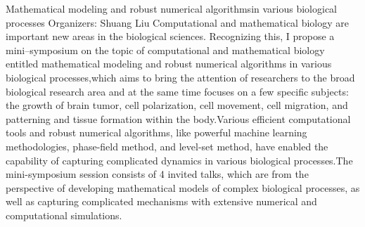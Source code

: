 \label{mini31}

\miniabs
{Mathematical modeling and robust numerical algorithmsin various biological processes}
{Organizers: Shuang Liu}
{Computational and mathematical biology are important new areas in the biological sciences. Recognizing this, I propose a mini–symposium on the topic of computational and mathematical biology entitled mathematical modeling and robust numerical algorithms in various biological processes,which aims to bring the attention of researchers to the broad biological research area and at the same time focuses on a few specific subjects: the growth of brain tumor, cell polarization, cell movement, cell migration, and patterning and tissue formation within the body.Various efficient computational tools and robust numerical algorithms, like powerful machine learning methodologies, phase-field method, and level-set method, have enabled the capability of capturing complicated dynamics in various biological processes.The mini-symposium session consists of 4 invited talks, which are from the perspective of developing mathematical models of complex biological processes, as well as capturing complicated mechanisms with extensive numerical and computational simulations.}


